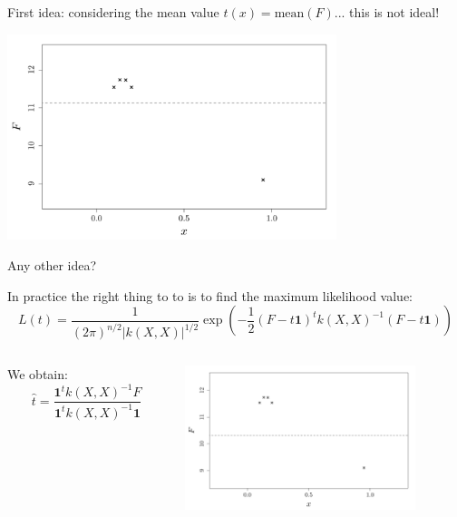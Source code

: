 \documentclass{beamer}
\begin{document}
\begin{frame}{}
    First idea: considering the mean value $t(x) = \text{mean}(F)$... this is not ideal!
\begin{center}
	\includegraphics[height=6cm]{figures/R/trend_pbbasicordinary}
\end{center}
Any other idea?
\end{frame}

\begin{frame}{}
In practice the right thing to to is to find the maximum likelihood value:
\begin{equation*}
L(t) = \frac{1}{\displaystyle (2 \pi)^{n/2} |k(X,X)|^{1/2}} \exp \left(-\frac12 (F-t \mathbf{1})^t k(X,X)^{-1} (F-t \mathbf{1})  \right)
\end{equation*}
\begin{columns}[c]
\begin{column}{4cm}
We obtain:
$$ \hat{t} = \frac{\mathbf{1}^t k(X,X)^{-1} F}{\mathbf{1}^t k(X,X)^{-1} \mathbf{1}}$$ 
\end{column}
\begin{column}{6cm}
\hspace{-8mm} \includegraphics[height=4.2cm]{figures/R/trend_estimordinary}
\end{column}
\end{columns}
\end{frame}
\end{document}
